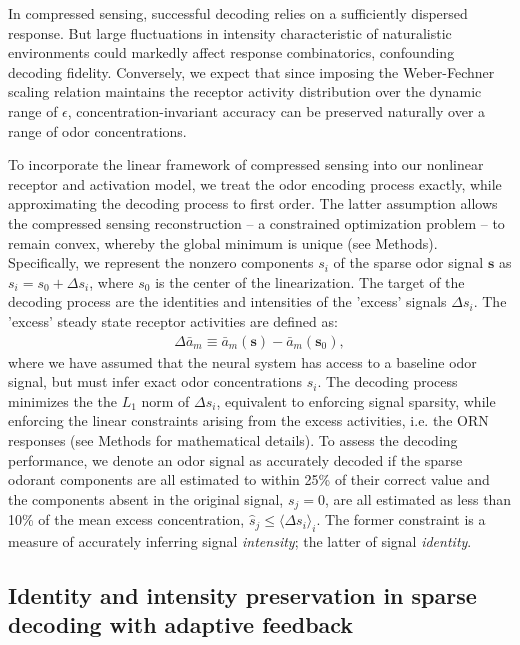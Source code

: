 In compressed sensing, successful decoding relies on a sufficiently dispersed response. But large fluctuations in intensity characteristic of naturalistic environments could markedly affect response combinatorics, confounding decoding fidelity. Conversely, we expect that since imposing the Weber-Fechner scaling relation maintains the receptor activity distribution over the dynamic range of $\epsilon$, concentration-invariant accuracy can be preserved naturally over a range of odor concentrations.

To incorporate the linear framework of compressed sensing into our nonlinear receptor and activation model, we treat the odor encoding process exactly, while approximating the decoding process to first order. The latter assumption allows the compressed sensing reconstruction -- a constrained optimization problem -- to remain convex, whereby the global minimum is unique (see Methods). Specifically, we represent the nonzero components $s_i$ of the sparse odor signal $\mathbf s$ as $s_i = s_0 + \Delta s_i$, where $s_0$ is the center of the linearization. The target of the decoding process are the identities and intensities of the 'excess' signals $\Delta s_i$. The 'excess' steady state receptor activities are defined as:
\begin{align}
\Delta \bar a_m \equiv \bar a_m(\mathbf s) - \bar a_m(\mathbf s_0),
\end{align}
where we have assumed that the neural system has access to a baseline odor signal, but must infer exact odor concentrations $s_i$. The decoding process minimizes the the $L_1$ norm of $\Delta s_i$, equivalent to enforcing signal sparsity, while enforcing the linear constraints arising from the excess activities, i.e. the ORN responses (see Methods for mathematical details). To assess the decoding performance, we denote an odor signal as accurately decoded if the sparse odorant components are all estimated to within 25\% of their correct value and the components absent in the original signal, $s_j = 0$, are all estimated as less than 10\% of the mean excess concentration, $\hat s_j \le \langle \Delta s_i \rangle_i$. The former constraint is a measure of accurately inferring signal \textit{intensity}; the latter of signal \textit{identity}. 

\subsection*{Identity and intensity preservation in sparse decoding with adaptive feedback}

